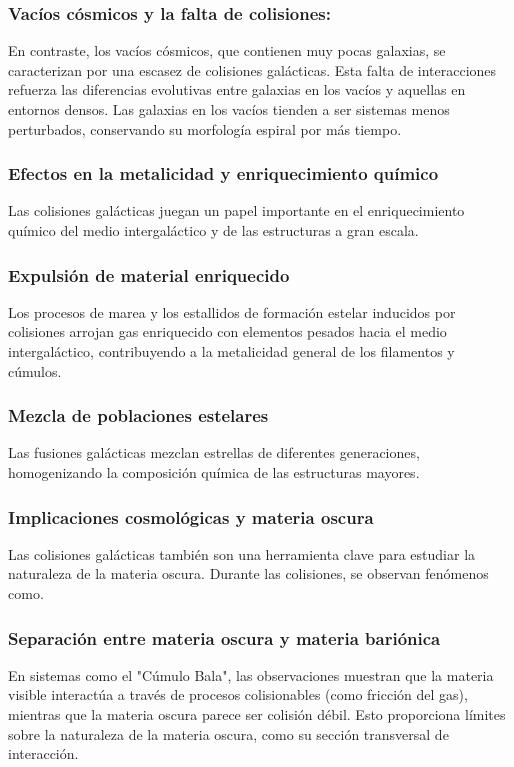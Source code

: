 \documentclass{article}
\begin{document}
\subsubsection*{Vacíos cósmicos y la falta de colisiones:}
En contraste, los vacíos cósmicos, que contienen muy pocas galaxias, se caracterizan por una escasez de colisiones galácticas. Esta falta de interacciones refuerza las diferencias evolutivas entre galaxias en los vacíos y aquellas en entornos densos. Las galaxias en los vacíos tienden a ser sistemas menos perturbados, conservando su morfología espiral por más tiempo.

\subsubsection{Efectos en la metalicidad y enriquecimiento químico}
Las colisiones galácticas juegan un papel importante en el enriquecimiento químico del medio intergaláctico y de las estructuras a gran escala.

\subsubsection*{Expulsión de material enriquecido}
Los procesos de marea y los estallidos de formación estelar inducidos por colisiones arrojan gas enriquecido con elementos pesados hacia el medio intergaláctico, contribuyendo a la metalicidad general de los filamentos y cúmulos.
\subsubsection*{Mezcla de poblaciones estelares}
Las fusiones galácticas mezclan estrellas de diferentes generaciones, homogenizando la composición química de las estructuras mayores.
\subsubsection{Implicaciones cosmológicas y materia oscura}
Las colisiones galácticas también son una herramienta clave para estudiar la naturaleza de la materia oscura. Durante las colisiones, se observan fenómenos como.

\subsubsection*{Separación entre materia oscura y materia bariónica}
En sistemas como el "Cúmulo Bala", las observaciones muestran que la materia visible interactúa a través de procesos colisionables (como fricción del gas), mientras que la materia oscura parece ser colisión débil. Esto proporciona límites sobre la naturaleza de la materia oscura, como su sección transversal de interacción.
\end{document}
